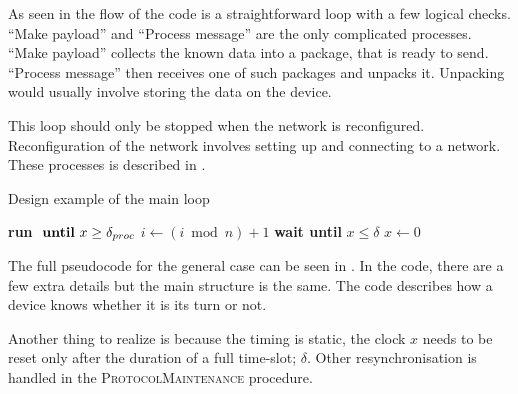 As seen in  the flow of the code is a straightforward loop with a few logical checks. 
\enquote{Make payload} and \enquote{Process message} are the only complicated processes. 
\enquote{Make payload} collects the known data into a package, that is ready to send. 
\enquote{Process message} then receives one of such packages and unpacks it. 
Unpacking would usually involve storing the data on the device.


\noindent%
This loop should only be stopped when the network is reconfigured. 
Reconfiguration of the network involves setting up and connecting to a network. 
These processes is described in .

\begin{algorithm}[ht]
\caption{Design example of the main loop}
\label{lst:general_case}
\begin{algorithmic}[1]
    \Repeat
        \State \textbf{run}  $\text{ \textbf{until} }x \ge \delta_{proc}$ 
        \State $i \gets (i \bmod n) + 1$
            \State {} 
            \State {}
        \Else
                    \State {}
                    \State {}
                \EndIf
            \EndWhile
        \EndIf
        \State \textbf{wait until } $x \le \delta$
        \State $x \gets 0$ 
\EndProcedure        
\end{algorithmic}    
\end{algorithm}

The full pseudocode for the general case can be seen in . 
In the code, there are a few extra details but the main structure is the same. 
The code describes how a device knows whether it is its turn or not.  

Another thing to realize is because the timing is static, the clock $x$ needs to be reset only after the duration of a full time-slot; $\delta$.
Other resynchronisation is handled in the \textsc{ProtocolMaintenance} procedure.
            

